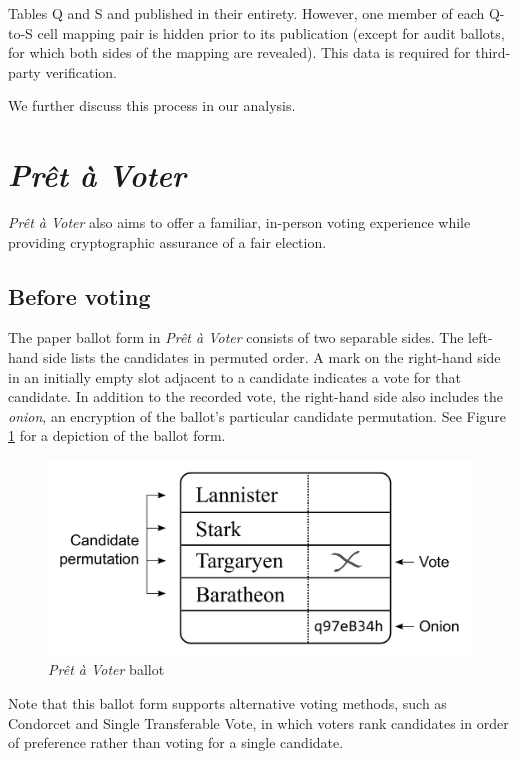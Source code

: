 \documentclass[10pt,twocolumn]{article}
\newcommand{\term}[1]{\textit{#1}}
\newcommand{\preta}{Pr\^{e}t \`{a}}
\newcommand{\pv}{\preta{} Voter}
\begin{document}
Tables Q and S and published in their entirety. However, one member of each Q-to-S cell mapping pair
is hidden prior to its publication (except for audit ballots, for which both sides of the mapping
are revealed). This data is required for third-party verification.

We further discuss this process in our analysis.

\section{\term{\pv{}}}

\term{\pv{}} \cite{preta} also aims to offer a familiar, in-person voting experience while providing cryptographic assurance of
a fair election.

\subsection{Before voting}

The paper ballot form in \term{\pv{}} consists of two separable sides.
The left-hand side lists the candidates in permuted order.
A mark on the right-hand side in an initially empty slot adjacent to a candidate indicates a vote for that candidate.
In addition to the recorded vote, the right-hand side also includes the \term{onion}, an encryption of the ballot's particular candidate permutation.
See Figure \ref{fig:preta} for a depiction of the ballot form.

\begin{figure}
	\center
	\includegraphics[width=\columnwidth]{images/include/preta.pdf}
	\caption{\term{\pv{}} ballot}
	\label{fig:preta}
\end{figure}

Note that this ballot form supports alternative voting methods, such as Condorcet and Single Transferable Vote, in which voters rank candidates in order of preference rather than voting for a single candidate.
\end{document}
